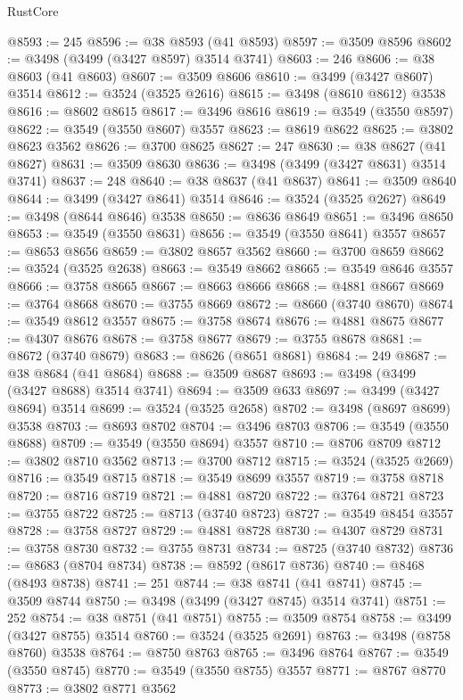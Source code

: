 \begin{lexlean}{RustCore}
\begin{coremodule}
@8593 := 245
@8596 := @38 @8593 (@41 @8593)
@8597 := @3509 @8596
@8602 := @3498 (@3499 (@3427 @8597) @3514 @3741)
@8603 := 246
@8606 := @38 @8603 (@41 @8603)
@8607 := @3509 @8606
@8610 := @3499 (@3427 @8607) @3514
@8612 := @3524 (@3525 @2616)
@8615 := @3498 (@8610 @8612) @3538
@8616 := @8602 @8615
@8617 := @3496 @8616
@8619 := @3549 (@3550 @8597)
@8622 := @3549 (@3550 @8607) @3557
@8623 := @8619 @8622
@8625 := @3802 @8623 @3562
@8626 := @3700 @8625
@8627 := 247
@8630 := @38 @8627 (@41 @8627)
@8631 := @3509 @8630
@8636 := @3498 (@3499 (@3427 @8631) @3514 @3741)
@8637 := 248
@8640 := @38 @8637 (@41 @8637)
@8641 := @3509 @8640
@8644 := @3499 (@3427 @8641) @3514
@8646 := @3524 (@3525 @2627)
@8649 := @3498 (@8644 @8646) @3538
@8650 := @8636 @8649
@8651 := @3496 @8650
@8653 := @3549 (@3550 @8631)
@8656 := @3549 (@3550 @8641) @3557
@8657 := @8653 @8656
@8659 := @3802 @8657 @3562
@8660 := @3700 @8659
@8662 := @3524 (@3525 @2638)
@8663 := @3549 @8662
@8665 := @3549 @8646 @3557
@8666 := @3758 @8665
@8667 := @8663 @8666
@8668 := @4881 @8667
@8669 := @3764 @8668
@8670 := @3755 @8669
@8672 := @8660 (@3740 @8670)
@8674 := @3549 @8612 @3557
@8675 := @3758 @8674
@8676 := @4881 @8675
@8677 := @4307 @8676
@8678 := @3758 @8677
@8679 := @3755 @8678
@8681 := @8672 (@3740 @8679)
@8683 := @8626 (@8651 @8681)
@8684 := 249
@8687 := @38 @8684 (@41 @8684)
@8688 := @3509 @8687
@8693 := @3498 (@3499 (@3427 @8688) @3514 @3741)
@8694 := @3509 @633
@8697 := @3499 (@3427 @8694) @3514
@8699 := @3524 (@3525 @2658)
@8702 := @3498 (@8697 @8699) @3538
@8703 := @8693 @8702
@8704 := @3496 @8703
@8706 := @3549 (@3550 @8688)
@8709 := @3549 (@3550 @8694) @3557
@8710 := @8706 @8709
@8712 := @3802 @8710 @3562
@8713 := @3700 @8712
@8715 := @3524 (@3525 @2669)
@8716 := @3549 @8715
@8718 := @3549 @8699 @3557
@8719 := @3758 @8718
@8720 := @8716 @8719
@8721 := @4881 @8720
@8722 := @3764 @8721
@8723 := @3755 @8722
@8725 := @8713 (@3740 @8723)
@8727 := @3549 @8454 @3557
@8728 := @3758 @8727
@8729 := @4881 @8728
@8730 := @4307 @8729
@8731 := @3758 @8730
@8732 := @3755 @8731
@8734 := @8725 (@3740 @8732)
@8736 := @8683 (@8704 @8734)
@8738 := @8592 (@8617 @8736)
@8740 := @8468 (@8493 @8738)
@8741 := 251
@8744 := @38 @8741 (@41 @8741)
@8745 := @3509 @8744
@8750 := @3498 (@3499 (@3427 @8745) @3514 @3741)
@8751 := 252
@8754 := @38 @8751 (@41 @8751)
@8755 := @3509 @8754
@8758 := @3499 (@3427 @8755) @3514
@8760 := @3524 (@3525 @2691)
@8763 := @3498 (@8758 @8760) @3538
@8764 := @8750 @8763
@8765 := @3496 @8764
@8767 := @3549 (@3550 @8745)
@8770 := @3549 (@3550 @8755) @3557
@8771 := @8767 @8770
@8773 := @3802 @8771 @3562

\end{coremodule}
\end{lexlean}
